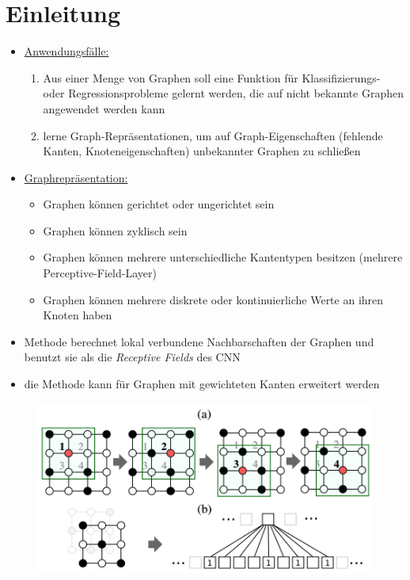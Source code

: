 \section{Einleitung}

\begin{itemize}
  \item \underline{Anwendungsfälle:}
  \begin{enumerate}
    \item Aus einer Menge von Graphen soll eine Funktion für Klassifizierungs- oder Regressionsprobleme gelernt werden, die auf nicht bekannte Graphen angewendet werden kann
    \item lerne Graph-Repräsentationen, um auf Graph-Eigenschaften (fehlende Kanten, Knoteneigenschaften) unbekannter Graphen zu schließen
  \end{enumerate}
\item \underline{Graphrepräsentation:}
  \begin{itemize}
    \item Graphen können gerichtet oder ungerichtet sein
    \item Graphen können zyklisch sein
    \item Graphen können mehrere unterschiedliche Kantentypen besitzen (mehrere Perceptive-Field-Layer)
    \item Graphen können mehrere diskrete oder kontinuierliche Werte an ihren Knoten haben
  \end{itemize}
\item Methode berechnet lokal verbundene Nachbarschaften der Graphen und benutzt sie als die \emph{Receptive Fields} des CNN
\item die Methode kann für Graphen mit gewichteten Kanten erweitert werden
\end{itemize}

\begin{figure}[h]
  \centering
  \includegraphics[width=.5\textwidth]{images/cnn_graph}
\end{figure}

